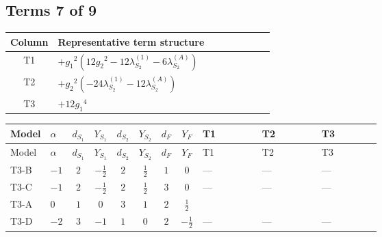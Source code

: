 \documentclass[8pt]{article}
\begin{document}
\begin{landscape}
\subsection*{Terms 7 of 9}
\begin{center}
\begin{tabular}{@{}c >{\raggedright\arraybackslash}p{0.82\linewidth}@{}}
\toprule
Column & Representative term structure \\
\midrule
T1 & \(\displaystyle +{g_1}^2 \left(12 {g_2}^2-12 {\lambda_{S_2}^{(1)}}-6 {\lambda_{S_2}^{(A)}}\right)\) \\
\midrule
T2 & \(\displaystyle +{g_2}^2 (-24 {\lambda_{S_2}^{(1)}}-12 {\lambda_{S_2}^{(A)}})\) \\
\midrule
T3 & \(\displaystyle +12 {g_1}^4\) \\
\midrule
\bottomrule
\end{tabular}
\end{center}
\smallskip
\tiny
\begin{longtable}{@{}llcccccc >{\raggedright\arraybackslash}p{0.21\linewidth} >{\raggedright\arraybackslash}p{0.21\linewidth} >{\raggedright\arraybackslash}p{0.21\linewidth}@{}}
\toprule
Model & $\alpha$ & $d_{S_1}$ & $Y_{S_1}$ & $d_{S_2}$ & $Y_{S_2}$ & $d_F$ & $Y_F$ & T1 & T2 & T3 \\
\midrule
\endfirsthead
\toprule
Model & $\alpha$ & $d_{S_1}$ & $Y_{S_1}$ & $d_{S_2}$ & $Y_{S_2}$ & $d_F$ & $Y_F$ & T1 & T2 & T3 \\
\midrule
\endhead
T3-B & $-1$ & $2$ & $-\frac{1}{2}$ & $2$ & $\frac{1}{2}$ & $1$ & $0$ & --- & --- & --- \\
\midrule
T3-C & $-1$ & $2$ & $-\frac{1}{2}$ & $2$ & $\frac{1}{2}$ & $3$ & $0$ & --- & --- & --- \\
\midrule
T3-A & $0$ & $1$ & $0$ & $3$ & $1$ & $2$ & $\frac{1}{2}$ & \scriptsize\adjustbox{max width=\linewidth}{$\begin{gathered} +{g_1}^2 \left(12 {g_2}^2-12 {\lambda_{S_2}^{(1)}}-6 {\lambda_{S_2}^{(A)}}\right)\end{gathered}$} & \scriptsize\adjustbox{max width=\linewidth}{$\begin{gathered} +{g_2}^2 (-24 {\lambda_{S_2}^{(1)}}-12 {\lambda_{S_2}^{(A)}})\end{gathered}$} & \scriptsize\adjustbox{max width=\linewidth}{$\begin{gathered} +12 {g_1}^4\end{gathered}$} \\
\midrule
T3-D & $-2$ & $3$ & $-1$ & $1$ & $0$ & $2$ & $-\frac{1}{2}$ & --- & --- & --- \\

\end{longtable}
\end{landscape}
\end{document}
